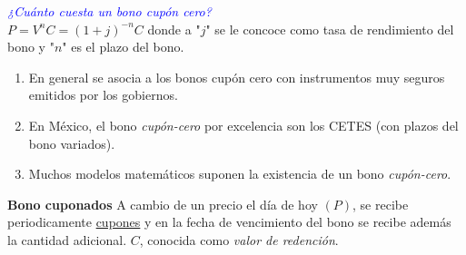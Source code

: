 \begin{center}
\end{center}

\textcolor{blue}{\textit{¿Cuánto cuesta un bono cupón cero?}}\\
$P=V^nC = (1+j)^{-n}C$ donde a "$j$" se le concoce como tasa de rendimiento del bono y "$n$" es el plazo del bono.

\begin{remark}
\begin{enumerate}
    \item En general se asocia a los bonos cupón cero con instrumentos muy seguros emitidos por los gobiernos.
    \item En México, el bono \textit{cupón-cero} por excelencia son los CETES (con plazos del bono variados).
    \item Muchos modelos matemáticos suponen la existencia de un bono \textit{cupón-cero}.
\end{enumerate}
\end{remark}


\textbf{Bono cuponados}
A cambio de un precio el día de hoy $(P)$, se recibe periodicamente \underline{cupones} y en la fecha de vencimiento del bono se recibe además la cantidad adicional. $C$, conocida como \textit{valor de redención}.

